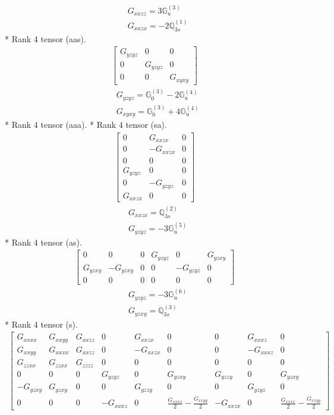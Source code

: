 \documentclass[fleqn,8pt,landscape]{jsarticle}
\begin{document}
\begin{align*}
& G_{xxzz} = 3 \mathbb{G}_{u}^{(3)} \\
& G_{xxzx} = - 2 \mathbb{Q}_{3s}^{(1)}
\end{align*}
* Rank 4 tensor (aas).
\begin{align*}
\begin{bmatrix} G_{yzyz} & 0 & 0 \\ 0 & G_{yzyz} & 0 \\ 0 & 0 & G_{xyxy} \end{bmatrix}
\end{align*}
\begin{align*}
& G_{yzyz} = \mathbb{G}_{0}^{(3)} - 2 \mathbb{G}_{u}^{(4)} \\
& G_{xyxy} = \mathbb{G}_{0}^{(3)} + 4 \mathbb{G}_{u}^{(4)}
\end{align*}
* Rank 4 tensor (aaa).
* Rank 4 tensor (sa).
\begin{align*}
\begin{bmatrix} 0 & G_{xxzx} & 0 \\ 0 & - G_{xxzx} & 0 \\ 0 & 0 & 0 \\ G_{yzyz} & 0 & 0 \\ 0 & - G_{yzyz} & 0 \\ G_{xxzx} & 0 & 0 \end{bmatrix}
\end{align*}
\begin{align*}
& G_{xxzx} = \mathbb{Q}_{3s}^{(2)} \\
& G_{yzyz} = - 3 \mathbb{G}_{u}^{(5)}
\end{align*}
* Rank 4 tensor (as).
\begin{align*}
\begin{bmatrix} 0 & 0 & 0 & G_{yzyz} & 0 & G_{yzxy} \\ G_{yzxy} & - G_{yzxy} & 0 & 0 & - G_{yzyz} & 0 \\ 0 & 0 & 0 & 0 & 0 & 0 \end{bmatrix}
\end{align*}
\begin{align*}
& G_{yzyz} = - 3 \mathbb{G}_{u}^{(6)} \\
& G_{yzxy} = \mathbb{Q}_{3s}^{(3)}
\end{align*}
* Rank 4 tensor (s).
\begin{align*}
\begin{bmatrix} G_{xxxx} & G_{xxyy} & G_{xxzz} & 0 & G_{xxzx} & 0 & 0 & G_{xxxz} & 0 \\ G_{xxyy} & G_{xxxx} & G_{xxzz} & 0 & - G_{xxzx} & 0 & 0 & - G_{xxxz} & 0 \\ G_{zzxx} & G_{zzxx} & G_{zzzz} & 0 & 0 & 0 & 0 & 0 & 0 \\ 0 & 0 & 0 & G_{yzyz} & 0 & G_{yzxy} & G_{yzzy} & 0 & G_{yzxy} \\ - G_{yzxy} & G_{yzxy} & 0 & 0 & G_{yzzy} & 0 & 0 & G_{yzyz} & 0 \\ 0 & 0 & 0 & - G_{xxxz} & 0 & \frac{G_{xxxx}}{2} - \frac{G_{xxyy}}{2} & - G_{xxzx} & 0 & \frac{G_{xxxx}}{2} - \frac{G_{xxyy}}{2} \end{bmatrix}
\end{align*}
\end{document}

